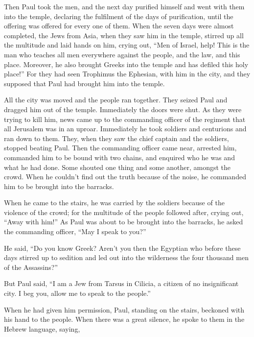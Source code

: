  Then Paul took the men, and the next day purified
himself and went with them into the temple, declaring the fulfilment of
the days of purification, until the offering was offered for every one
of them.  When the seven days were almost completed, the
Jews from Asia, when they saw him in the temple, stirred up all the
multitude and laid hands on him,  crying out, ``Men of
Israel, help! This is the man who teaches all men everywhere against the
people, and the law, and this place. Moreover, he also brought Greeks
into the temple and has defiled this holy place!''  For
they had seen Trophimus the Ephesian, with him in the city, and they
supposed that Paul had brought him into the temple.

 All the city was moved and the people ran together. They
seized Paul and dragged him out of the temple. Immediately the doors
were shut.  As they were trying to kill him, news came up
to the commanding officer of the regiment that all Jerusalem was in an
uproar.  Immediately he took soldiers and centurions and
ran down to them. They, when they saw the chief captain and the
soldiers, stopped beating Paul.  Then the commanding
officer came near, arrested him, commanded him to be bound with two
chains, and enquired who he was and what he had done. 
Some shouted one thing and some another, amongst the crowd. When he
couldn't find out the truth because of the noise, he commanded him to be
brought into the barracks.

 When he came to the stairs, he was carried by the
soldiers because of the violence of the crowd;  for the
multitude of the people followed after, crying out, ``Away with him!''
 As Paul was about to be brought into the barracks, he
asked the commanding officer, ``May I speak to you?''

He said, ``Do you know Greek?  Aren't you then the
Egyptian who before these days stirred up to sedition and led out into
the wilderness the four thousand men of the Assassins?''

 But Paul said, ``I am a Jew from Tarsus in Cilicia, a
citizen of no insignificant city. I beg you, allow me to speak to the
people.''

 When he had given him permission, Paul, standing on the
stairs, beckoned with his hand to the people. When there was a great
silence, he spoke to them in the Hebrew language, saying,

